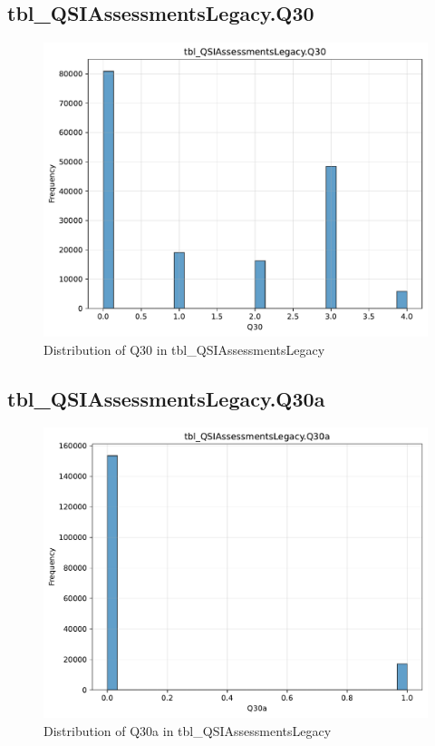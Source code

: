 \subsection{tbl\_QSIAssessmentsLegacy.Q30}

\begin{figure}[htbp]
\centering
\includegraphics[width=\textwidth]{figures/dbo_tbl_QSIAssessmentsLegacy_Q30.pdf}
\caption{Distribution of Q30 in tbl\_QSIAssessmentsLegacy}
\end{figure}\newpage

\subsection{tbl\_QSIAssessmentsLegacy.Q30a}

\begin{figure}[htbp]
\centering
\includegraphics[width=\textwidth]{figures/dbo_tbl_QSIAssessmentsLegacy_Q30a.pdf}
\caption{Distribution of Q30a in tbl\_QSIAssessmentsLegacy}
\end{figure}\newpage

